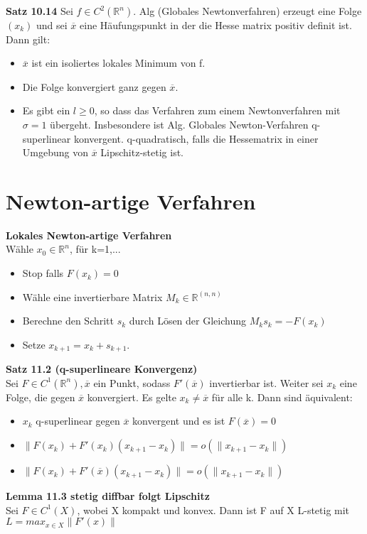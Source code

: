 \documentclass[a4paper,10pt]{article}
\begin{document}
\textbf{Satz 10.14}
Sei $f\in C^2(\mathbb{R}^n)$. Alg (Globales Newtonverfahren) erzeugt eine Folge $(x_k)$ und sei $\overline{x}$ eine Häufungspunkt in der die Hesse matrix positiv definit ist. Dann gilt:
\begin{itemize}
\item $\overline{x}$ ist ein isoliertes lokales Minimum von f.
\item Die Folge konvergiert ganz gegen $\overline{x}$.
\item Es gibt ein $l\geq 0$, so dass das Verfahren zum einem Newtonverfahren mit $\sigma=1$ übergeht. Insbesondere ist Alg. Globales Newton-Verfahren q-superlinear konvergent. q-quadratisch, falls die Hessematrix in einer Umgebung von $\overline{x}$ Lipschitz-stetig ist.
\end{itemize}

\section{Newton-artige Verfahren}
\textbf{Lokales Newton-artige Verfahren}\\
Wähle $x_0\in \mathbb{R}^n$, für k=1,...
\begin{itemize}
\item Stop falls $F(x_k)=0$
\item Wähle eine invertierbare Matrix $M_k\in \mathbb{R}^{(n,n)}$
\item Berechne den Schritt $s_k$ durch Lösen der Gleichung $M_ks_k=-F(x_k)$
\item Setze $x_{k+1}=x_k+s_{k+1}$.	
\end{itemize}


\textbf{Satz 11.2 (q-superlineare Konvergenz)}\\
Sei $F\in C^1(\mathbb{R}^n), \overline{x}$ ein Punkt, sodass $F'(\overline{x})$ invertierbar ist. Weiter sei $x_k$ eine Folge, die gegen $\overline{x}$ konvergiert. Es gelte $x_k\neq \overline{x}$ für alle k. Dann sind äquivalent:
\begin{itemize}
\item $x_k$ q-superlinear gegen $\overline{x}$ konvergent und es ist $F(\overline{x})=0$
\item $\|F(x_k)+F'(x_k)(x_{k+1}-x_k)\|=o(\|x_{k+1}-x_k\|)$
\item $\|F(x_k)+F'(\overline{x})(x_{k+1}-x_k)\|=o(\|x_{k+1}-x_k\|)$
\end{itemize}


\textbf{Lemma 11.3 stetig diffbar folgt Lipschitz}\\
Sei $F\in C^1(X)$, wobei X kompakt und konvex. Dann ist F auf X L-stetig mit $L=max_{x\in X}\|F'(x)\|$
\end{document}
